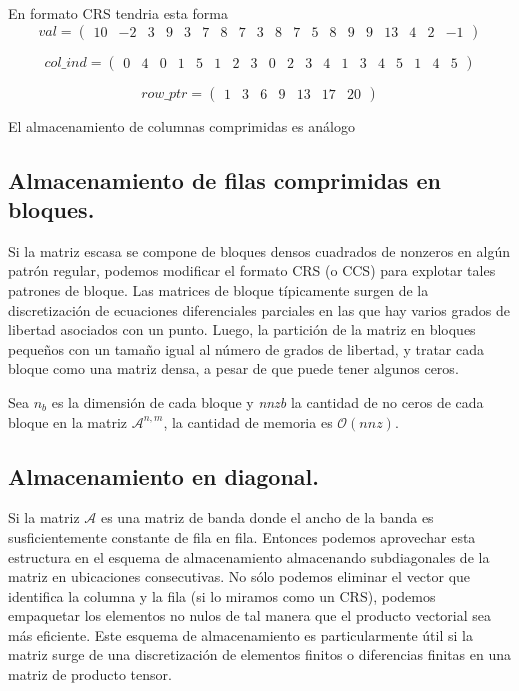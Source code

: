 \documentclass[a4paper,openright,12pt, oneside]{book}
\DeclareRobustCommand{\orderof}{\ensuremath{\mathcal{O}}}
\begin{document}
En formato CRS tendria esta forma
\begin{equation}
val = 
\left(
\begin{array}{ccccccccccccccccccc}
10& -2& 3& 9& 3 & 7& 8& 7& 3& 8& 7& 5& 8& 9& 9& 13 & 4& 2& -1 
\end{array}
\right)
\end{equation}

\begin{equation}
col\_ind = 
\left(
\begin{array}{ccccccccccccccccccc}
0 & 4 & 0 & 1 & 5 & 1 & 2 & 3 & 0 & 2 & 3 & 4 & 1 & 3 & 4 & 5 & 1 & 4 & 5
\end{array}
\right)
\end{equation}


\begin{equation}
row\_ptr = 
\left(
\begin{array}{ccccccc}
1 & 3 & 6 & 9 & 13 & 17 & 20
\end{array}
\right)
\end{equation}




El almacenamiento de columnas comprimidas es an\'alogo

\subsection{Almacenamiento de filas comprimidas en bloques.}

Si la matriz escasa se compone de bloques densos cuadrados de nonzeros en alg\'un patr\'on regular, podemos modificar el formato CRS (o CCS) para explotar tales patrones de bloque. Las matrices de bloque t\'ipicamente surgen de la discretizaci\'on de ecuaciones diferenciales parciales en las que hay varios grados de libertad asociados con un punto. Luego, la partici\'on de la matriz en bloques peque\~nos con un tama\~no igual al n\'umero de grados de libertad, y tratar cada bloque como una matriz densa, a pesar de que puede tener algunos ceros.

Sea \textit{$n_{b}$} es la dimensi\'on de cada bloque y \textit{nnzb} la cantidad de no ceros de cada bloque en la matriz $\mathcal{A}^{n,m}$, la cantidad de memoria es $\orderof(nnz)$.

\subsection{Almacenamiento en diagonal.}

Si la matriz $\mathcal{A}$ es una matriz de banda donde el ancho de la banda es susficientemente constante de fila en fila. Entonces podemos aprovechar esta estructura en el esquema de almacenamiento almacenando subdiagonales de la matriz en ubicaciones consecutivas. No s\'olo podemos eliminar el vector que identifica la columna y la fila (si lo miramos como un CRS), podemos empaquetar los elementos no nulos de tal manera que el producto vectorial sea m\'as eficiente. Este esquema de almacenamiento es particularmente \'util si la matriz surge de una discretizaci\'on de elementos finitos o diferencias finitas en una matriz de producto tensor.
\end{document}
